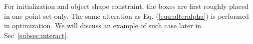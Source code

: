 For initialization and object shape constraint, the boxes are first roughly placed in one point set only. 
The same alteration as Eq. (\ref{equ:alteralpha}) is performed in optimization. We will discuss an example of such case later in Sec~\ref{subsec:interact}.
